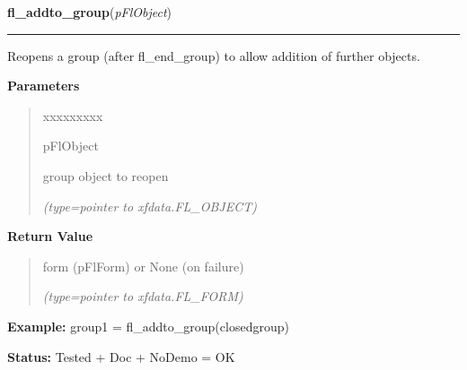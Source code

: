\hspace{.8\funcindent}\begin{boxedminipage}{\funcwidth}

    \raggedright \textbf{fl\_addto\_group}(\textit{pFlObject})

    \vspace{-1.5ex}

    \rule{\textwidth}{0.5\fboxrule}
\setlength{\parskip}{2ex}
    Reopens a group (after fl\_end\_group) to allow addition of further 
    objects.

\setlength{\parskip}{1ex}
      \textbf{Parameters}
      \vspace{-1ex}

      \begin{quote}
        \begin{Ventry}{xxxxxxxxx}

          \item[pFlObject]

          group object to reopen

            {\it (type=pointer to xfdata.FL\_OBJECT)}

        \end{Ventry}

      \end{quote}

      \textbf{Return Value}
    \vspace{-1ex}

      \begin{quote}
      form (pFlForm) or None (on failure)

      {\it (type=pointer to xfdata.FL\_FORM)}

      \end{quote}

\textbf{Example:} group1 = fl\_addto\_group(closedgroup)



\textbf{Status:} Tested + Doc + NoDemo = OK



    \end{boxedminipage}

    \label{xformslib:flbasic:fl_get_object_objclass}

    \vspace{0.5ex}

